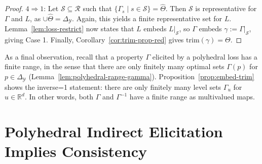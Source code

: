 \documentclass[11pt]{article}
\newcommand{\Comments}{1}
\newcommand{\mytodo}[2]{\ifnum\Comments=1%
  \todo[linecolor=#1!80!black,backgroundcolor=#1,bordercolor=#1!80!black]{#2}\fi}
\newcommand{\jessiet}[1]{\mytodo{teal!20!white}{JF: #1}}
\newcommand{\reals}{\mathbb{R}}
\newcommand{\simplex}{\Delta_\Y}
\newcommand{\R}{\mathcal{R}}
\newcommand{\Sc}{\mathcal{S}}
\newcommand{\U}{\mathcal{U}}
\newcommand{\Y}{\mathcal{Y}}
\newcommand{\trimred}{\mathrm{trim}}
\begin{document}
\begin{proof}
  $4 \Rightarrow 1$:
  Let $\Sc\subseteq\R$ such that $\{\Gamma_s \mid s\in\Sc\} = \hat \Theta$.
  Then $\Sc$ is representative for $\Gamma$ and $L$, as $\cup\hat\Theta = \simplex$.
  Again, this yields a finite representative set for $L$.
  Lemma~\ref{lem:loss-restrict} now states that $L$ embeds $L|_\Sc$, so $\Gamma$ embeds $\gamma := \Gamma|_\Sc$, giving Case 1.
  Finally, Corollary~\ref{cor:trim-prop-red} gives $\trimred(\gamma) = \Theta$.
\end{proof}

As a final observation, recall that a property $\Gamma$ elicited by a polyhedral loss has a finite range, in the sense that there are only finitely many optimal sets $\Gamma(p)$ for $p\in\simplex$ (Lemma~\ref{lem:polyhedral-range-gamma}).
Proposition~\ref{prop:embed-trim} shows the inverse\jessiet{word choice?} statement: there are only finitely many level sets $\Gamma_u$ for $u\in\reals^d$.
In other words, both $\Gamma$ and $\Gamma^{-1}$ have a finite range as multivalued maps.

\section{Polyhedral Indirect Elicitation Implies Consistency}
\label{sec:poly-ie-consistency}
\end{document}
